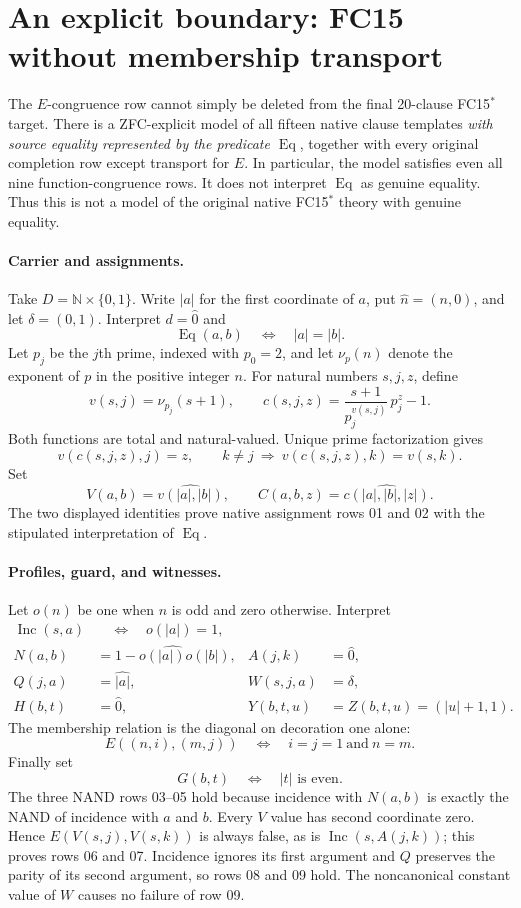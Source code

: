 \section{An explicit boundary: FC15 without membership transport}
\label{sec:fc15-e-countermodel}

The $E$-congruence row cannot simply be deleted from the final
20-clause FC15$^*$ target. There is a ZFC-explicit model of all fifteen
native clause templates \emph{with source equality represented by the
predicate $\operatorname{Eq}$}, together with every original completion
row except transport for $E$. In particular, the model satisfies even
all nine function-congruence rows. It does not interpret
$\operatorname{Eq}$ as genuine equality. Thus this is not a model of
the original native FC15$^*$ theory with genuine equality.

\paragraph{Carrier and assignments.}
Take $D=\mathbb N\times\{0,1\}$. Write $|a|$ for the first coordinate
of $a$, put $\widehat n=(n,0)$, and let $\delta=(0,1)$. Interpret
$d=\widehat0$ and
\[
\operatorname{Eq}(a,b)\quad\Longleftrightarrow\quad |a|=|b|.
\]
Let $p_j$ be the $j$th prime, indexed with $p_0=2$, and let
$\nu_p(n)$ denote the exponent of $p$ in the positive integer $n$.
For natural numbers $s,j,z$, define
\[
v(s,j)=\nu_{p_j}(s+1),\qquad
c(s,j,z)=\frac{s+1}{p_j^{v(s,j)}}\,p_j^z-1.
\]
Both functions are total and natural-valued. Unique prime
factorization gives
\[
v(c(s,j,z),j)=z,\qquad
k\ne j\ \Longrightarrow\ v(c(s,j,z),k)=v(s,k).
\]
Set
\[
V(a,b)=\widehat{v(|a|,|b|)},\qquad
C(a,b,z)=\widehat{c(|a|,|b|,|z|)}.
\]
The two displayed identities prove native assignment rows 01 and 02
with the stipulated interpretation of $\operatorname{Eq}$.

\paragraph{Profiles, guard, and witnesses.}
Let $o(n)$ be one when $n$ is odd and zero otherwise. Interpret
\[
\begin{aligned}
\operatorname{Inc}(s,a)&\quad\Longleftrightarrow\quad o(|a|)=1,\\
N(a,b)&=\widehat{1-o(|a|)o(|b|)},&
A(j,k)&=\widehat0,\\
Q(j,a)&=\widehat{|a|},&
W(s,j,a)&=\delta,\\
H(b,t)&=\widehat0,&
Y(b,t,u)&=Z(b,t,u)=(|u|+1,1).
\end{aligned}
\]
The membership relation is the diagonal on decoration one alone:
\[
E((n,i),(m,j))\quad\Longleftrightarrow\quad i=j=1\ \text{and}\ n=m.
\]
Finally set
\[
G(b,t)\quad\Longleftrightarrow\quad |t|\text{ is even}.
\]
The three NAND rows 03--05 hold because incidence with $N(a,b)$ is
exactly the NAND of incidence with $a$ and $b$. Every $V$ value has
second coordinate zero. Hence $E(V(s,j),V(s,k))$ is always false,
as is $\operatorname{Inc}(s,A(j,k))$; this proves rows 06 and 07.
Incidence ignores its first argument and $Q$ preserves the parity of
its second argument, so rows 08 and 09 hold. The noncanonical constant
value of $W$ causes no failure of row 09.

